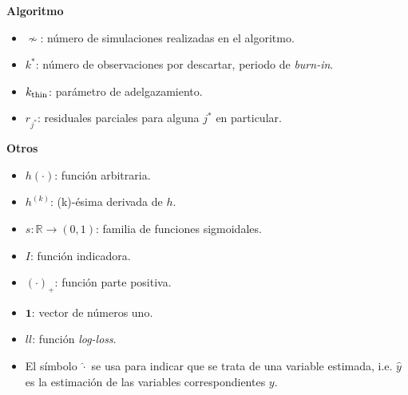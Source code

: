 \documentclass[../../Main/Main.tex]{subfiles}
\begin{document}
\textbf{Algoritmo}
\begin{itemize}[label={}]
	\item $\nsim$: número de simulaciones realizadas en el algoritmo.
	\item $k^*$: número de observaciones por descartar, periodo de \textit{burn-in}. 
	\item $k_{\text{thin}}$: parámetro de adelgazamiento. 
	\item $r_{j^*}$: residuales parciales para alguna $j^*$ en particular. 
\end{itemize}

\textbf{Otros}
\begin{itemize}[label={}]
	\item $h(\cdot)$: función arbitraria. 
	\item $h^{(k)}$: (k)-ésima derivada de $h$. 
	\item $s: \mathbb{R} \rightarrow (0,1)$: familia de funciones sigmoidales. 
	\item $I$: función indicadora. 
	\item $(\cdot)_{+}$: función parte positiva. 
	\item $\mathbf{1}$: vector de números uno.
	\item $ll$: función \textit{log-loss}. 
	\item El símbolo $\hat{\cdot}$ se usa para indicar que se trata de una variable estimada, i.e. $\hat{y}$ es la estimación de las variables correspondientes $y$.
\end{itemize}
\end{document}
